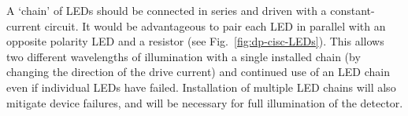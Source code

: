 A `chain' of LEDs should be connected in series and driven with a
constant-current circuit. It would be advantageous to pair each
LED in parallel with an opposite polarity LED and a resistor
(see Fig.~\ref{fig:dp-cisc-LEDs}).
This allows two different wavelengths of illumination with a single installed
chain (by changing the direction of the drive current) and 
continued use of an LED chain even if individual LEDs have failed.
Installation of multiple LED chains will also mitigate device failures,
and will be necessary for full illumination of the detector.
